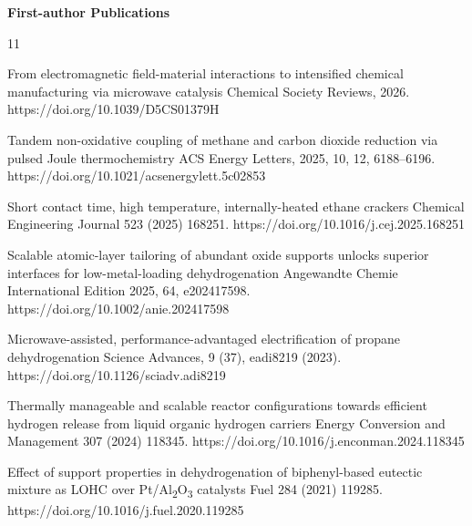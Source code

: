 \textbf{First-author Publications}
\begin{publist}{11}

    {From electromagnetic field-material interactions to intensified chemical manufacturing
     via microwave catalysis}
    {Chemical Society Reviews}{, 2026.}
    {https://doi.org/10.1039/D5CS01379H}

    {Tandem non-oxidative coupling of methane and carbon dioxide reduction via pulsed Joule
     thermochemistry}
    {ACS Energy Letters}{, 2025, 10, 12, 6188--6196.}
    {https://doi.org/10.1021/acsenergylett.5c02853}

    {Short contact time, high temperature, internally-heated ethane crackers}
    {Chemical Engineering Journal}{ 523 (2025) 168251.}
    {https://doi.org/10.1016/j.cej.2025.168251}

    {Scalable atomic-layer tailoring of abundant oxide supports unlocks superior interfaces
     for low-metal-loading dehydrogenation}
    {Angewandte Chemie International Edition}{ 2025, 64, e202417598.}
    {https://doi.org/10.1002/anie.202417598}

    {Microwave-assisted, performance-advantaged electrification of propane dehydrogenation}
    {Science Advances}{, 9 (37), eadi8219 (2023).}
    {https://doi.org/10.1126/sciadv.adi8219}

    {Thermally manageable and scalable reactor configurations towards efficient hydrogen
     release from liquid organic hydrogen carriers}
    {Energy Conversion and Management}{ 307 (2024) 118345.}
    {https://doi.org/10.1016/j.enconman.2024.118345}

    {Effect of support properties in dehydrogenation of biphenyl-based eutectic mixture as
     LOHC over Pt/Al\textsubscript{2}O\textsubscript{3} catalysts}
    {Fuel}{ 284 (2021) 119285.}
    {https://doi.org/10.1016/j.fuel.2020.119285}


\end{publist}
